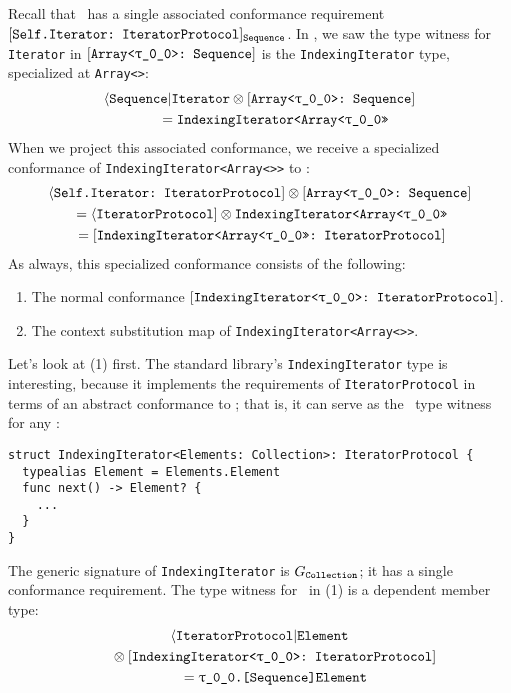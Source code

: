 \documentclass[../generics]{subfiles}
\begin{document}
\begin{example}\label{indexing iterator example}
Recall that \tSequence\ has a single associated conformance requirement $[\texttt{Self.Iterator:~IteratorProtocol}]_{\texttt{Sequence}}$. In , we saw the type witness for \texttt{Iterator} in $\ArraySequence$ is the \texttt{IndexingIterator} type, specialized at \texttt{Array<\rT>}:
\begin{gather*}
\AIterator \otimes \ArraySequence\\
\qquad {} = \texttt{IndexingIterator<Array<\rT>>}
\end{gather*}
When we project this associated conformance, we receive a specialized conformance of \texttt{IndexingIterator<Array<\rT>>} to \tIterator:
\begin{gather*}
\AssocConf{Self.Iterator}{IteratorProtocol} \otimes \ArraySequence\\
{} = \PIterator \otimes \texttt{IndexingIterator<Array<\rT>>}\\
{} = \ConfReq{IndexingIterator<Array<\rT>>}{IteratorProtocol}
\end{gather*}
As always, this specialized conformance consists of the following:
\begin{enumerate}
\item The normal conformance $\ConfReq{IndexingIterator<\rT>}{IteratorProtocol}$.
\item The context substitution map of \texttt{IndexingIterator<Array<\rT>>}.
\end{enumerate}
Let's look at (1) first. The standard library's \texttt{IndexingIterator} type is interesting, because it implements the requirements of \texttt{IteratorProtocol} in terms of an abstract conformance to \tCollection; that is, it can serve as the \nIterator\ type witness for any \tCollection:
\begin{Verbatim}
struct IndexingIterator<Elements: Collection>: IteratorProtocol {
  typealias Element = Elements.Element
  func next() -> Element? {
    ...
  }
}
\end{Verbatim}
The generic signature of \texttt{IndexingIterator} is $G_{\texttt{Collection}}$; it has a single conformance requirement. The type witness for \nElement\ in (1) is a dependent member type:
\begin{gather*}
\AIElement \\
\qquad {} \otimes \ConfReq{IndexingIterator<\rT>}{IteratorProtocol} \\
\qquad {} = \texttt{\rT.[Sequence]Element}
\end{gather*}

\end{example}
\end{document}
